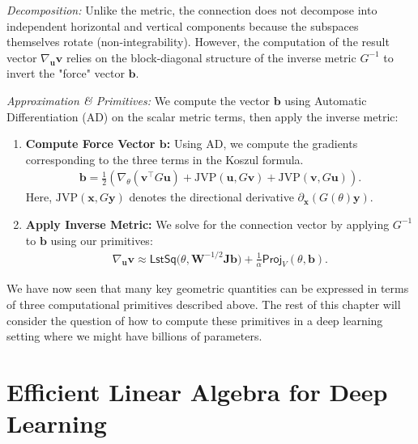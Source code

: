\begin{enumerate}
    \emph{Decomposition:} 
    Unlike the metric, the connection does not decompose into independent horizontal and vertical components because the subspaces themselves rotate (non-integrability). However, the computation of the result vector $\nabla_{\mathbf{u}} \mathbf{v}$ relies on the block-diagonal structure of the inverse metric $G^{-1}$ to invert the "force" vector $\mathbf{b}$.
    
    \emph{Approximation \& Primitives:} 
    We compute the vector $\mathbf{b}$ using Automatic Differentiation (AD) on the scalar metric terms, then apply the inverse metric:
    \begin{enumerate}
        \item \textbf{Compute Force Vector $\mathbf{b}$:} 
        Using AD, we compute the gradients corresponding to the three terms in the Koszul formula.
        \begin{align}
            \mathbf{b} = \frac{1}{2} \left( \nabla_\theta (\mathbf{v}^\top G \mathbf{u}) + \text{JVP}(\mathbf{u}, G\mathbf{v}) + \text{JVP}(\mathbf{v}, G\mathbf{u}) \right).
        \end{align}
        Here, $\text{JVP}(\mathbf{x}, G\mathbf{y})$ denotes the directional derivative $\partial_{\mathbf{x}}(G(\theta)\mathbf{y})$.
        \item \textbf{Apply Inverse Metric:}
        We solve for the connection vector by applying $G^{-1}$ to $\mathbf{b}$ using our primitives:
        \begin{align}
            \nabla_{\mathbf{u}} \mathbf{v} \approx \textsf{LstSq}\big(\theta, \mathbf{W}^{-1/2} \mathbf{J} \mathbf{b} \big) + \frac{1}{\alpha} \textsf{Proj}_V(\theta, \mathbf{b}).
        \end{align}
    \end{enumerate}    
\end{enumerate}

We have now seen that many key geometric quantities can be expressed in terms of three computational primitives described above. The rest of this chapter will consider the question of how to compute these primitives in a deep learning setting where we might have billions of parameters.

\section{Efficient Linear Algebra for Deep Learning}
\label{sec:la_computations}

